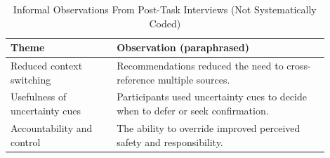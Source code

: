 \documentclass[journal]{IEEEtran}
\theoremstyle{plain}
\theoremstyle{definition}
\providecommand{\DIFaddbegin}{} %
\providecommand{\DIFaddend}{} %
\providecommand{\DIFdelbegin}{} %
\providecommand{\DIFdelend}{} %
\newcommand{\DIFscaledelfig}{0.5}
\newlength{\DIFdelgraphicswidth} %
\newlength{\DIFdelgraphicsheight} %
\newcommand{\DIFaddincludegraphics}[2][]{{\color{blue}\fbox{\DIFOincludegraphics[#1]{#2}}}} %
\newcommand{\DIFdelincludegraphics}[2][]{%
\sbox{\DIFdelgraphicsbox}{\DIFOincludegraphics[#1]{#2}}%
\settoboxwidth{\DIFdelgraphicswidth}{\DIFdelgraphicsbox} %
\settoboxtotalheight{\DIFdelgraphicsheight}{\DIFdelgraphicsbox} %
\scalebox{\DIFscaledelfig}{%
\parbox[b]{\DIFdelgraphicswidth}{\usebox{\DIFdelgraphicsbox}\\[-\baselineskip] \rule{\DIFdelgraphicswidth}{0em}}\llap{\resizebox{\DIFdelgraphicswidth}{\DIFdelgraphicsheight}{%
\setlength{\unitlength}{\DIFdelgraphicswidth}%
\begin{picture}(1,1)%
\thicklines\linethickness{2pt} %
{\color[rgb]{1,0,0}\put(0,0){\framebox(1,1){}}}%
{\color[rgb]{1,0,0}\put(0,0){\line( 1,1){1}}}%
{\color[rgb]{1,0,0}\put(0,1){\line(1,-1){1}}}%
\end{picture}%
}\hspace*{3pt}}} %
} %
\DeclareRobustCommand{\DIFaddbegin}{\DIFOaddbegin \let\includegraphics\DIFaddincludegraphics} %
\DeclareRobustCommand{\DIFaddend}{\DIFOaddend \let\includegraphics\DIFOincludegraphics} %
\DeclareRobustCommand{\DIFdelbegin}{\DIFOdelbegin \let\includegraphics\DIFdelincludegraphics} %
\DeclareRobustCommand{\DIFdelend}{\DIFOaddend \let\includegraphics\DIFOincludegraphics} %
\begin{document}
    \DIFdelbegin %
\DIFdelend \DIFaddbegin \begin{table}[t]
        \caption{Informal Observations From Post-Task Interviews (Not Systematically Coded)}
        \label{tab:qualitative}
        \centering
        \begin{tabular}{p{0.30\linewidth}p{0.60\linewidth}}
            \toprule
            \textbf{Theme} & \textbf{Observation (paraphrased)} \\
            \midrule
            Reduced context switching & Recommendations reduced the need to cross-reference multiple sources. \\
            Usefulness of uncertainty cues & Participants used uncertainty cues to decide when to defer or seek confirmation. \\
            Accountability and control & The ability to override improved perceived safety and responsibility. \\
            \bottomrule
        \end{tabular}
    \end{table}
\DIFaddend 
\end{document}
